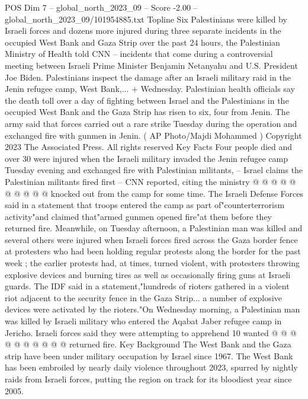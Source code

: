 \begin{textsample}{POS Dim 7 – global\_north\_2023\_09 – Score -2.00 – global\_north\_2023\_09/101954885.txt}  \label{ex:f7_pos_287}
Topline Six Palestinians were killed by Israeli forces and dozens more injured during three separate incidents in the occupied West Bank and Gaza Strip over the past 24 hours, the Palestinian Ministry of Health told CNN -- incidents that come during a controversial meeting between Israeli Prime Minister Benjamin Netanyahu and U.S.
President Joe Biden.
Palestinians inspect the damage after an Israeli military raid in the Jenin refugee camp, West Bank,... + Wednesday.
Palestinian health officials say the death toll over a day of fighting between Israel and the Palestinians in the occupied West Bank and the Gaza Strip has risen to six, four from Jenin.
The army said that forces carried out a rare strike Tuesday during the operation and exchanged fire with gunmen in Jenin. ( AP Photo/Majdi Mohammed ) Copyright 2023 The Associated Press.
All rights reserved Key Facts Four people died and over 30 were injured when the Israeli military invaded the Jenin refugee camp Tuesday evening and exchanged fire with Palestinian militants, -- Israel claims the Palestinian militants fired first -- CNN reported, citing the ministry @ @ @ @ @ @ @ @ @ @ knocked out from the camp for some time.
The Israeli Defense Forces said in a statement that troops entered the camp as part of"counterterrorism activity"and claimed that"armed gunmen opened fire"at them before they returned fire.
Meanwhile, on Tuesday afternoon, a Palestinian man was killed and several others were injured when Israeli forces fired across the Gaza border fence at protesters who had been holding regular protests along the border for the past week ; the earlier protests had, at times, turned violent, with protesters throwing explosive devices and burning tires as well as occasionally firing guns at Israeli guards.
The IDF said in a statement,"hundreds of rioters gathered in a violent riot adjacent to the security fence in the Gaza Strip... a number of explosive devices were activated by the rioters."On Wednesday morning, a Palestinian man was killed by Israeli military who entered the Aqabat Jaber refugee camp in Jericho.
Israeli forces said they were attempting to apprehend 10 wanted @ @ @ @ @ @ @ @ @ @ returned fire.
Key Background The West Bank and the Gaza strip have been under military occupation by Israel since 1967.
The West Bank has been embroiled by nearly daily violence throughout 2023, spurred by nightly raids from Israeli forces, putting the region on track for its bloodiest year since 2005.

\end{textsample}
